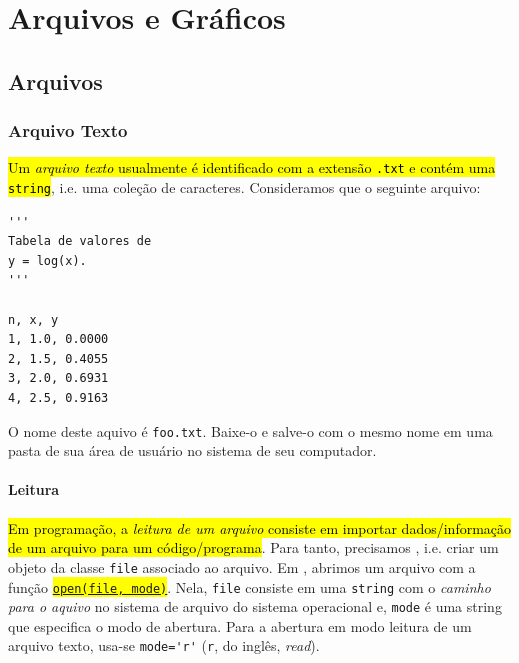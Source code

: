 
\chapter{Arquivos e Gráficos}\label{cap_ag}
\thispagestyle{fancy}

\section{Arquivos}\label{cap_ag_sec_arq}

\subsection{Arquivo Texto}

\hl{Um \emph{arquivo texto} usualmente é identificado com a extensão {\lstinline+.txt+} e contém uma {\lstinline+string+}}, i.e. uma coleção de caracteres. Consideramos que o seguinte arquivo:

\begin{lstlisting}[caption = foo.txt, label=cap_ag_sec_arq:cod:foo.txt]
'''
Tabela de valores de
y = log(x).
'''

n, x, y
1, 1.0, 0.0000
2, 1.5, 0.4055
3, 2.0, 0.6931
4, 2.5, 0.9163
\end{lstlisting}

O nome deste aquivo é \lstinline+foo.txt+. Baixe-o e salve-o com o mesmo nome em uma pasta de sua área de usuário no sistema de seu computador.

\subsubsection{Leitura}

\hl{Em programação, a \emph{leitura de um arquivo} consiste em importar dados/informação de um arquivo para um código/programa}. Para tanto, precisamos , i.e. criar um objeto da classe {\lstinline+file+} associado ao arquivo. Em {\python}, abrimos um arquivo com a função \hl{{\href{https://docs.python.org/3/library/functions.html\#open}{\lstinline+open(file, mode)+}}}. Nela, \lstinline+file+ consiste em uma \lstinline+string+ com o \emph{caminho para o aquivo} no sistema de arquivo do sistema operacional e, \lstinline+mode+ é uma string que especifica o modo de abertura. Para a abertura em modo leitura de um arquivo texto, usa-se \lstinline+mode='r'+ (\lstinline+r+, do inglês, \textit{read}).

